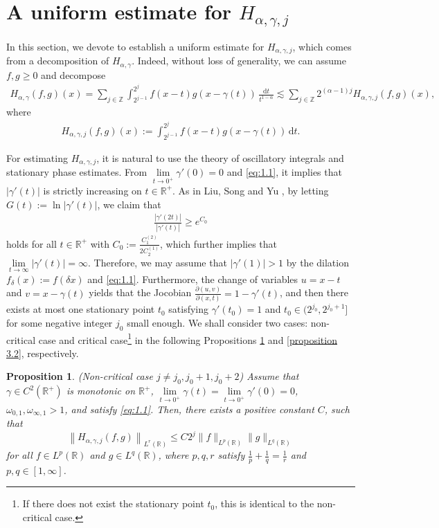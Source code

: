 \documentclass[11pt, twoside, leqno]{article}
\newtheorem{proposition}[theorem]{Proposition}
\theoremstyle{definition}
\numberwithin{equation}{section}
\begin{document}
\section{A uniform estimate for $H_{\alpha,\gamma,j}$}

In this section, we devote to establish a uniform estimate for $H_{\alpha,\gamma,j}$, which comes from a decomposition of $H_{\alpha,\gamma}$. Indeed, without loss of generality, we can assume $f, g\geq 0$ and decompose
 \begin{align*}
H_{\alpha,\gamma}(f,g)(x)=\sum_{j \in \mathbb{Z}}\int_{2^{j-1}}^{2^j}f(x-t)g(x-\gamma(t))\,\frac{\textrm{d}t}{t^{1-\alpha}}\lesssim \sum_{j \in \mathbb{Z}}2^{(\alpha-1)j}H_{\alpha,\gamma,j}(f,g)(x),
\end{align*}
where
\begin{align}\label{eq:3.1}
H_{\alpha,\gamma,j}(f,g)(x):=\int_{2^{j-1}}^{2^j}f(x-t)g(x-\gamma(t))\,\textrm{d}t.
\end{align}

For estimating $H_{\alpha,\gamma,j}$, it is natural to use the theory of oscillatory integrals and stationary phase estimates. From $\lim\limits_{t\rightarrow 0^+}\gamma'(0)=0$ and \eqref{eq:1.1}, it implies that $|\gamma'(t)|$ is strictly increasing on $t\in\mathbb{R}^+$. As in Liu, Song and Yu \cite[Remark 1.4]{LSY}, by letting $G(t):=\ln |\gamma'(t)|$, we claim that
\begin{align}\label{eq:3.2}
 \frac{|\gamma'(2t)|}{|\gamma'(t)|}\geq e^{C_0 }
  \end{align}
holds for all $t\in \mathbb{R}^+$ with $C_0:=\frac{C^{(2)}_{1}}{2C^{(1)}_{2}}$, which further implies that $\lim\limits_{t\rightarrow \infty}|\gamma'(t)|=\infty$. Therefore, we may assume that $|\gamma'(1)|>1 $ by the dilation $f_{\delta}(x):=f(\delta x)$ and \eqref{eq:1.1}. Furthermore, the change of variables $u=x-t$ and $v=x-\gamma(t)$ yields that the Jocobian ${\frac{\partial(u,v)}{\partial(x,t)}}=1-\gamma'(t)$, and then there exists at most one stationary point $t_0$ satisfying $\gamma'(t_0)=1$ and $t_0\in(2^{j_0},2^{j_{0}+1}]$ for some negative integer $j_0$ small enough. We shall consider two cases: non-critical case and critical case\footnote{If there does not exist the stationary point $t_0$, this is identical to the non-critical case.} in the following Propositions \ref{proposition 3.1} and \ref{proposition 3.2}, respectively.

\begin{proposition}\label{proposition 3.1} (Non-critical case $j\neq j_0, j_0+1, j_0+2$) Assume that $\gamma\in C^2(\mathbb{R}^+)$ is monotonic on $\mathbb{R}^+$, $\lim\limits_{t\rightarrow 0^+}\gamma(t)=\lim\limits_{t\rightarrow 0^+}\gamma'(0)=0$, $\omega_{0,1}, \omega_{\infty,1}> 1$, and satisfy \eqref{eq:1.1}. Then, there exists a positive constant $C$, such that
$$\left\|H_{\alpha,\gamma,j}(f,g)\right\|_{L^{r}(\mathbb{R})}\leq C 2^j\|f\|_{L^{p}(\mathbb{R})}\|g\|_{L^{q}(\mathbb{R})}$$
 for all $f\in L^{p}(\mathbb{R})$ and $g\in L^{q}(\mathbb{R})$, where $p,q,r$ satisfy $\frac{1}{p}+\frac{1}{q}=\frac{1}{r}$ and $p, q \in [1, \infty]$.
\end{proposition}
\end{document}
